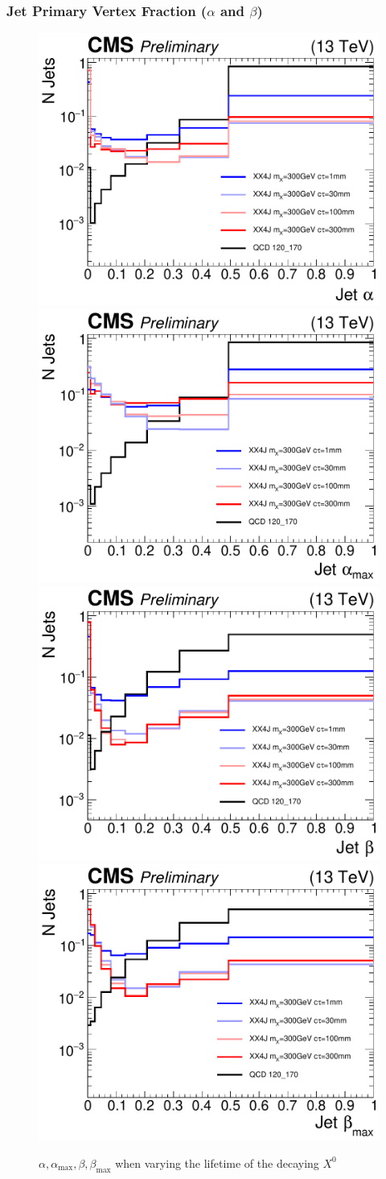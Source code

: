 \subsubsection{Jet Primary Vertex Fraction ($\alpha$ and $\beta$)}

\begin{figure}
\begin{center}
\includegraphics[width=.45\textwidth]{figures/an_jetid/VTX_MATCH_IP/XX4J_alpha}
\includegraphics[width=.45\textwidth]{figures/an_jetid/VTX_MATCH_IP/XX4J_alphaMax}
\includegraphics[width=.45\textwidth]{figures/an_jetid/VTX_MATCH_IP/XX4J_beta}
\includegraphics[width=.45\textwidth]{figures/an_jetid/VTX_MATCH_IP/XX4J_betaMax}
\end{center}
\caption{$\alpha, \alpha_{\textrm{max}}, \beta, \beta_{\textrm{max}}$ when varying the lifetime of the decaying $X^0$}
\label{fig:xx4j_alpha_beta}
\end{figure}

